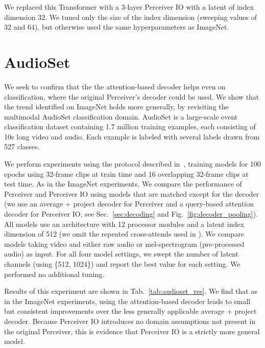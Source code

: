 \documentclass{article} \usepackage{iclr2022_conference,times}
\newcommand{\ourmodel}{Perceiver IO\xspace}
\begin{document}
We replaced this Transformer with a 3-layer \ourmodel{} with a latent of index dimension 32. We tuned only the size of the index dimension (sweeping values of 32 and 64), but otherwise used the same hyperparameters as ImageNet.

\section{AudioSet}
\label{sec:audioset_appendix}

We seek to confirm that the the attention-based decoder helps even on classification, where the original Perceiver's decoder could be used. We show that the trend identified on ImageNet holds more generally, by revisiting the multimodal AudioSet classification domain. AudioSet is a large-scale event classification dataset containing 1.7 million training examples, each consisting of 10s long video and audio. Each example is labeled with several labels drawn from 527 classes. 

We perform experiments using the protocol described in~\cite{jaegle2021perceiver}, training models for 100 epochs using 32-frame clips at train time and 16 overlapping 32-frame clips at test time. As in the ImageNet experiments, We compare the performance of Perceiver and \ourmodel{} using models that are matched except for the decoder (we use an average + project decoder for Perceiver and a query-based attention decoder for \ourmodel{}, see Sec.~\ref{sec:decoding} and Fig.~\ref{fig:decoder_pooling}). All models use an architecture with 12 processor modules and a latent index dimension  of 512 (we omit the repeated cross-attends used in \cite{jaegle2021perceiver}). We compare models taking video and either raw audio or mel-spectrogram (pre-processed audio) as input. For all four model settings, we swept the number of latent channels (using  \{512, 1024\}) and report the best value for each setting. We performed no additional tuning.

Results of this experiment are shown in Tab.~\ref{tab:audioset_res}. We find that as in the ImageNet experiments, using the attention-based decoder leads to small but consistent improvements over the less generally applicable average + project decoder. Because \ourmodel{} introduces no domain assumptions not present in the original Perceiver, this is evidence that \ourmodel{} is a strictly more general model.
\end{document}
